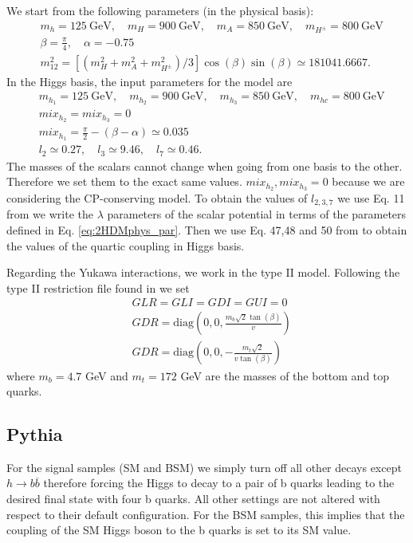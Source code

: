 We start from the following parameters (in the physical basis):
\begin{align}
	&m_h=125 ~\text{GeV}, \quad m_H=900 ~\text{GeV},\quad m_A=850 ~\text{GeV}, \quad m_{H^{\pm}}=800 ~\text{GeV} \nonumber \\
	&\beta=\frac{\pi}{4}, \quad \alpha = -0.75\nonumber \\	 
	&m_{12}^2=[(m_H^2+m_A^2+m_{H^{\pm}}^2)/3] \cos(\beta)\sin(\beta)\simeq181041.6667.
	\label{eq:2HDMphys_par}
\end{align}
In the Higgs basis, the input parameters for the model are
\begin{align}
&m_{h_1}=125 ~\text{GeV}, \quad m_{h_2}=900 ~\text{GeV},\quad m_{h_3}=850 ~\text{GeV}, \quad m_{hc}=800 ~\text{GeV} \nonumber \\
&mix_{h_2}=mix_{h_3} =0 \nonumber \\
&mix_{h_1}=\frac{\pi}{2}-(\beta-\alpha)\simeq 0.035 \nonumber \\
&l_2\simeq 0.27, \quad l_3\simeq 9.46, \quad l_7\simeq 0.46.
\label{eq:2HDMhiggs_par}
\end{align}
The masses of the scalars cannot change when going from one basis to the other. Therefore we set them to the exact same values. $mix_{h_2},mix_{h_3}=0$ because we are considering the CP-conserving model.
To obtain the values of $l_{2,3,7}$ we use Eq. 11 from \cite{2HDMpedro} we write the $\lambda$ parameters of the scalar potential in terms of the parameters defined in Eq. \ref{eq:2HDMphys_par}. Then we use Eq. 47,48 and 50 from \cite{2HDMhaber} to obtain the values of the quartic coupling in Higgs basis.

Regarding the Yukawa interactions, we work in the type II model. Following the type II restriction file found in \cite{2HDM} we set
\begin{align}
	&GLR=GLI=GDI=GUI=0 \nonumber \\
	&GDR=\text{diag}\left(0,0,\frac{m_b\sqrt{2}\tan(\beta)}{v}\right) \nonumber \\
	&GDR=\text{diag}\left(0,0,-\frac{m_t\sqrt{2}}{v\tan(\beta)}\right)
\end{align}	
where $m_b=4.7$ GeV and $m_t=172$ GeV are the masses of the bottom and top quarks.

\subsection{Pythia}
\label{sec:Pythia_samples}

For the signal samples (SM and BSM) we simply turn off all other decays except $h\rightarrow b\overline{b}$ therefore forcing the Higgs to decay to a pair of b quarks leading to the desired final state with four b quarks. All other settings are not altered with respect to their default configuration. For the BSM samples, this implies that the coupling of the SM Higgs boson to the b quarks is set to its SM value.

